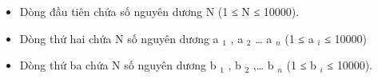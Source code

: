 \begin{itemize}
	\item     Dòng đầu tiên chứa số nguyên dương N (1 ≤ N ≤ 10000).   
	\item     Dòng thứ hai chứa N số nguyên dương a    $_     1    $    , a    $_     2    $    … a    $_     n    $    (1 ≤ a    $_     i    $    ≤ 10000)   
	\item     Dòng thứ ba chứa N số nguyên dương b    $_     1    $    , b    $_     2    $    ,… b    $_     n    $    (1 ≤ b    $_     i    $    ≤ 10000).   
\end{itemize}

\